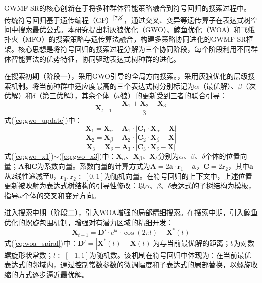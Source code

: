 \documentclass[a4paper,12pt]{ctexart}
\begin{document}
GWMF-SR的核心创新在于将多种群体智能策略融合到符号回归的搜索过程中。传统符号回归基于遗传编程（GP）\textsuperscript{[7,8]}，通过交叉、变异等遗传算子在表达式树空间中搜索最优公式。本研究提出将灰狼优化（GWO）、鲸鱼优化（WOA）和飞蛾扑火（MFO）的搜索策略与遗传算法融合，构建多策略协同进化的GWMF-SR框架。核心思想是将符号回归的搜索过程分解为三个协同阶段，每个阶段利用不同群体智能算法的优势特征，协同驱动表达式树种群的进化。

在搜索初期（阶段一），采用GWO引导的全局方向搜索。，采用灰狼优化的层级搜索机制。将当前种群中适应度最高的三个表达式树分别标记为$\alpha$（最优解）、$\beta$（次优解）和$\delta$（第三优解），其余个体（$\omega$狼）的更新受到三者的联合引导：
\begin{equation}
  \mathbf{X}_{t+1} = \frac{\mathbf{X}_1 + \mathbf{X}_2 + \mathbf{X}_3}{3} \tag{2}
  \label{eq:gwo_update}
\end{equation}
式(\ref{eq:gwo_update})中：
\begin{equation}
  \mathbf{X}_1 = \mathbf{X}_\alpha - \mathbf{A}_1 \cdot |\mathbf{C}_1 \cdot \mathbf{X}_\alpha - \mathbf{X}| \tag{3}
  \label{eq:gwo_x1}
\end{equation}
\begin{equation}
  \mathbf{X}_2 = \mathbf{X}_\beta - \mathbf{A}_2 \cdot |\mathbf{C}_2 \cdot \mathbf{X}_\beta - \mathbf{X}| \tag{4}
  \label{eq:gwo_x2}
\end{equation}
\begin{equation}
  \mathbf{X}_3 = \mathbf{X}_\delta - \mathbf{A}_3 \cdot |\mathbf{C}_3 \cdot \mathbf{X}_\delta - \mathbf{X}| \tag{5}
  \label{eq:gwo_x3}
\end{equation}
式(\ref{eq:gwo_x1})$\sim$(\ref{eq:gwo_x3})中：$\mathbf{X}_\alpha$、$\mathbf{X}_\beta$、$\mathbf{X}_\delta$分别为$\alpha$、$\beta$、$\delta$个体的位置向量；$\mathbf{A}$和$\mathbf{C}$为系数向量。系数向量的计算方式为$\mathbf{A} = 2\mathbf{a} \cdot \mathbf{r}_1 - \mathbf{a}$，$\mathbf{C} = 2\mathbf{r}_2$，其中$\mathbf{a}$从2线性递减至0，$\mathbf{r}_1, \mathbf{r}_2 \in [0,1]$为随机向量。在符号回归的上下文中，上述位置更新被映射为表达式树结构的引导性修改：以$\alpha$、$\beta$、$\delta$表达式的子树结构为模板，指导$\omega$个体的交叉和变异方向。

进入搜索中期（阶段二），引入WOA增强的局部精细搜索。在搜索中期，引入鲸鱼优化的螺旋包围机制，增强对有潜力区域的精细开发：
\begin{equation}
  \mathbf{X}_{t+1} = \mathbf{D}' \cdot e^{bl} \cdot \cos(2\pi l) + \mathbf{X}^*(t) \tag{6}
  \label{eq:woa_spiral}
\end{equation}
式(\ref{eq:woa_spiral})中：$\mathbf{D}' = |\mathbf{X}^*(t) - \mathbf{X}(t)|$为与当前最优解的距离；$b$为对数螺旋形状常数；$l \in [-1, 1]$为随机数。该机制在符号回归中体现为：在当前最优表达式的邻域内，通过控制常数参数的微调幅度和子表达式的局部替换，以螺旋收缩的方式逐步逼近最优解。
\end{document}
